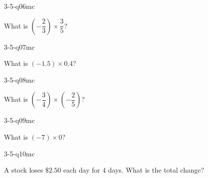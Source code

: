 \begin{practiceQuestion}{3-5-q06}{mc}
\begin{questionText}
What is $\left(-\dfrac{2}{3}\right) \times \dfrac{3}{5}$?
\end{questionText}
\end{practiceQuestion}

\begin{practiceQuestion}{3-5-q07}{mc}
\begin{questionText}
What is $(-1.5) \times 0.4$?
\end{questionText}
\end{practiceQuestion}

\begin{practiceQuestion}{3-5-q08}{mc}
\begin{questionText}
What is $\left(-\dfrac{3}{4}\right) \times \left(-\dfrac{2}{5}\right)$?
\end{questionText}
\end{practiceQuestion}

\begin{practiceQuestion}{3-5-q09}{mc}
\begin{questionText}
What is $(-7) \times 0$?
\end{questionText}
\end{practiceQuestion}

\begin{practiceQuestion}{3-5-q10}{mc}
\begin{questionText}
A stock loses $\$2.50$ each day for $4$ days. What is the total change?
\end{questionText}
\end{practiceQuestion}

